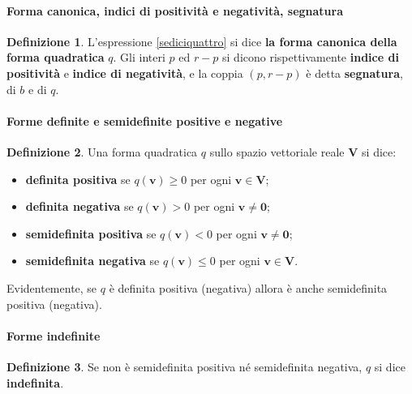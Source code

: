 \documentclass{article}
\theoremstyle{plain}
\theoremstyle{definition}
\newtheorem{defn}{Definizione}[section]
\theoremstyle{remark}
\begin{document}
\vspace{10pt}

\paragraph{Forma canonica, indici di positività e negatività, segnatura}
\begin{bxthm}
\begin{defn}
L'espressione \ref{sediciquattro} si dice \textbf{la forma canonica della forma quadratica} $q$. Gli interi $p$ ed $r - p$ 
si dicono rispettivamente \textbf{indice di positività} e \textbf{indice di negatività}, e la coppia $(p,r-p)$ è detta 
\textbf{segnatura}, di $b$ e di $q$.
\end{defn}
\end{bxthm}

\vspace{10pt}

\paragraph{Forme definite e semidefinite positive e negative}
\begin{bxthm}
\begin{defn}
Una forma quadratica $q$ sullo spazio vettoriale reale $\mathbf{V}$ si dice: 
\begin{itemize}
    \item \textbf{definita positiva} se $q(\mathbf{v}) \geq 0$ per ogni $\mathbf{v} \in \mathbf{V}$; 
    \item \textbf{definita negativa} se $q(\mathbf{v}) > 0$ per ogni $\mathbf{v}\neq\mathbf{0}$; 
    \item \textbf{semidefinita positiva} se $q(\mathbf{v}) < 0$ per ogni $\mathbf{v}\neq\mathbf{0}$; 
    \item \textbf{semidefinita negativa} se $q(\mathbf{v}) \leq 0$ per ogni $\mathbf{v} \in \mathbf{V}$.    
\end{itemize}
\end{defn}
\end{bxthm}

\vspace{10pt}

Evidentemente, se $q$ è definita positiva (negativa) allora è anche semidefinita positiva (negativa). 

\vspace{10pt}

\paragraph{Forme indefinite}
\begin{bxthm}
\begin{defn}
Se non è semidefinita positiva né semidefinita negativa, $q$ si dice \textbf{indefinita}.
\end{defn}
\end{bxthm}
\end{document}
